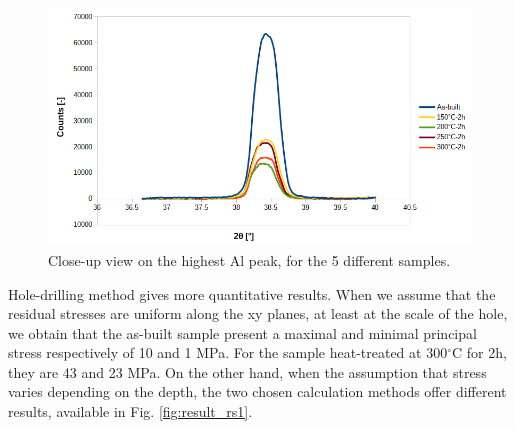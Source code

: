 \begin{figure}[ht]
	\centering
	\centerline{\includegraphics[scale=0.60]{Images/XRD_zoom}}
	\decoRule
	\caption[Close-up view on the highest Al peak, for the 5 different samples]{Close-up view on the highest Al peak, for the 5 different samples.}
	\label{fig:XRD_zoom}
\end{figure}

\begin{center}
	\begin{table}[ht]
		\noindent{}
	
	\caption[Full width at half-maximum for the cut as-built sample and the 4 cubix heat-treated samples]{Average tensile mechanical properties of the as-built specimens from batch X200-180417}
	\label{tab:fwhm}
\end{table}
\end{center}

Hole-drilling method gives more quantitative results. When we assume that the residual stresses are uniform along the xy planes, at least at the scale of the hole, we obtain that the as-built sample present a maximal and minimal principal stress respectively of 10 and 1 MPa. For the sample heat-treated at 300$^\circ$C for 2h, they are 43 and 23 MPa. On the other hand, when the assumption that stress varies depending on the depth, the two chosen calculation methods offer different results, available in Fig. \ref{fig:result_rs1}.

